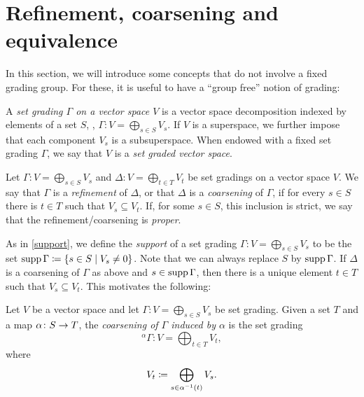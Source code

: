 
\section{Refinement, coarsening and equivalence}\label{ssec:universal_group}

In this section, we will introduce some concepts that do not involve a fixed grading group. 
For these, it is useful to have a ``group free'' notion of grading:

\begin{defi}\label{defi:set-grading}
    A \emph{set grading $\Gamma$ on a vector space $V$} is a vector space decomposition indexed by elements of a set $S$, \ie, 
    $\Gamma : V = \bigoplus_{s\in S} V_s$. 
    If $V$ is a superspace, we further impose that each component $V_s$ is a subsuperspace. 
    When endowed with a fixed set grading $\Gamma$, we say that $V$ is a \emph{set graded vector space}. 
\end{defi}

\begin{defi}\label{defi:ref-coars}
    Let $\Gamma : V = \bigoplus_{s\in S} V_s$ and $\Delta : V = \bigoplus_{t \in T} V_{t}$ be set gradings on a vector space $V$. 
    We say that $\Gamma$ is a \emph{refinement} of $\Delta$, or that $\Delta$ is a \emph{coarsening} of $\Gamma$, if for every $s \in S$ there is $t \in T$ such that $V_s \subseteq V_t$. 
    If, for some $s \in S$, this inclusion is strict, we say that the refinement/coarsening is \emph{proper}. 
\end{defi}


As in \cref{support}, we define the \emph{support} of a set grading $\Gamma : V = \bigoplus_{s\in S} V_s$ to be the set $\operatorname{supp} \Gamma \coloneqq \{ s \in S \mid V_s \neq 0 \}$. 
Note that we can always replace $S$ by $\operatorname{supp} \Gamma$. 
If $\Delta$ is a coarsening of $\Gamma$ as above and $s\in \operatorname{supp} \Gamma$, then there is a unique element $t \in T$ such that $V_s \subseteq V_t$. 
This motivates the following:

\begin{defi}\label{coars-induced}
    Let $V$ be a vector space and let $\Gamma : V = \bigoplus_{s\in S} V_s$ be set grading. 
    Given a set $T$ and a map $\alpha\colon S \to T$, the \emph{coarsening of $\Gamma$ induced by $\alpha$} is the set grading 
    \[
        {}^{\alpha}\Gamma : V = \bigoplus_{t\in T} V_t,
    \]
    where 
    \[
        V_t \coloneqq \bigoplus_{s \in \alpha^{-1} (t)} V_s.
    \]
\end{defi}

